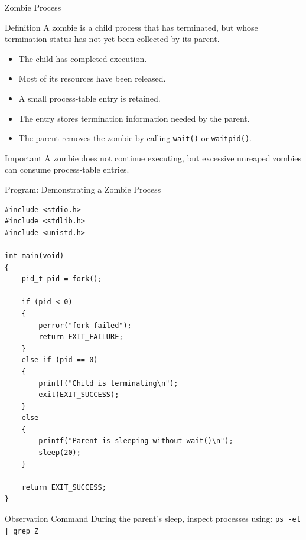 \documentclass[aspectratio=169]{beamer}
\begin{document}
\begin{frame}{Zombie Process}

\begin{block}{Definition}
A zombie is a child process that has terminated, but whose termination status has
not yet been collected by its parent.
\end{block}

\begin{itemize}
    \item The child has completed execution.
    \item Most of its resources have been released.
    \item A small process-table entry is retained.
    \item The entry stores termination information needed by the parent.
    \item The parent removes the zombie by calling \texttt{wait()} or
    \texttt{waitpid()}.
\end{itemize}

\begin{alertblock}{Important}
A zombie does not continue executing, but excessive unreaped zombies can consume
process-table entries.
\end{alertblock}

\end{frame}

\begin{frame}[fragile]{Program: Demonstrating a Zombie Process}

\begin{lstlisting}[style=cstyle]
#include <stdio.h>
#include <stdlib.h>
#include <unistd.h>

int main(void)
{
    pid_t pid = fork();

    if (pid < 0)
    {
        perror("fork failed");
        return EXIT_FAILURE;
    }
    else if (pid == 0)
    {
        printf("Child is terminating\n");
        exit(EXIT_SUCCESS);
    }
    else
    {
        printf("Parent is sleeping without wait()\n");
        sleep(20);
    }

    return EXIT_SUCCESS;
}
\end{lstlisting}

\begin{block}{Observation Command}
During the parent's sleep, inspect processes using:
\texttt{ps -el | grep Z}
\end{block}

\end{frame}
\end{document}
